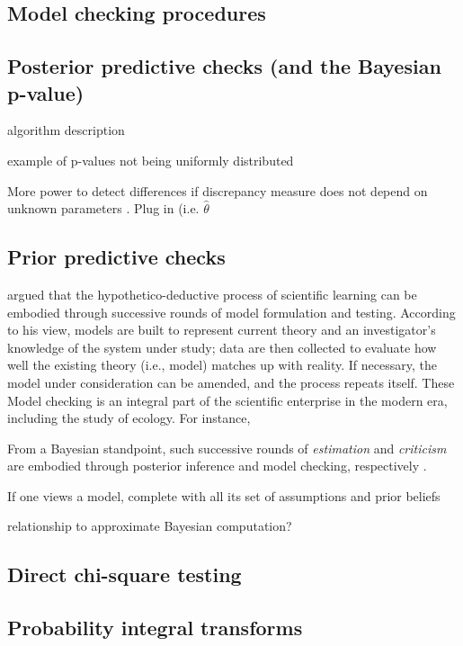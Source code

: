 \documentclass[12pt,english]{article}
\begin{document}
\begin{spacing}{1.9}
\section{Model checking procedures}

\subsection{Posterior predictive checks (and the Bayesian p-value)}

algorithm description

example of p-values not being uniformly distributed

More power to detect differences if discrepancy measure does not depend on unknown parameters \citep[][Chapter 8]{LunEtAl2013}.  Plug in (i.e. $\hat{\theta}$

\subsection{Prior predictive checks}

\citet{Box1980} argued that the hypothetico-deductive process of scientific learning can be embodied through successive rounds of model formulation and testing. According to his view, models are built to represent current theory and an investigator's knowledge of the system under study; data are then collected to evaluate how well the existing theory (i.e., model) matches up with reality.  If necessary, the model under consideration can be amended, and the process repeats itself.  These Model checking is an integral part of the scientific enterprise in the modern era, including the study of ecology.  For instance,

From a Bayesian standpoint, such successive rounds of \textit{estimation} and \textit{criticism} are embodied through posterior inference and model checking, respectively \citep{Box1980}. 

If one views a model, complete with all its set of assumptions and prior beliefs

relationship to approximate Bayesian computation?

\subsection{Direct chi-square testing}

\citet{Johnson2004}

\subsection{Probability integral transforms}


\end{spacing}
\end{document}
